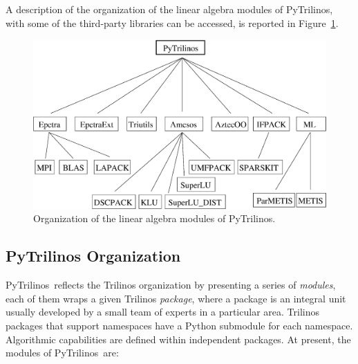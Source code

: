 \documentclass[10pt,relax]{SANDreport}
\newcommand{\PyTrilinos}{{PyTrilinos}}
\begin{document}
A description of the organization of  the linear algebra modules of
PyTrilinos, with some of the third-party libraries can be accessed,
is reported in Figure~\ref{fig:organization}.

\begin{figure}
\begin{center}
\includegraphics[width=12cm]{../UsersGuide/organization.eps}
\caption{Organization of the linear algebra modules of PyTrilinos.}
\label{fig:organization}
\end{center}
\end{figure}

\subsection{PyTrilinos Organization}
\label{sec:organization}

\PyTrilinos\ reflects the Trilinos organization by presenting a series
of {\sl modules}, each of them wraps a given Trilinos {\sl package},
 where a package is an integral unit usually
developed by a small team of experts in a particular area.
Trilinos packages that support namespaces have a Python submodule for
each namespace.  Algorithmic capabilities are defined within
independent packages. At present, the modules of \PyTrilinos\ are:
\end{document}
